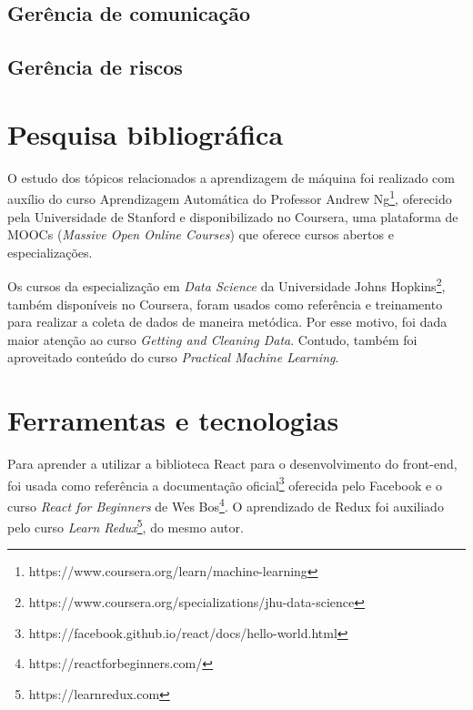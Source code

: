 
\subsection{Gerência de comunicação}


\subsection{Gerência de riscos}

\section{Pesquisa bibliográfica}

O estudo dos tópicos relacionados a aprendizagem de máquina foi realizado com auxílio do curso Aprendizagem Automática do Professor Andrew Ng\footnote{ https://www.coursera.org/learn/machine-learning}, oferecido pela Universidade de Stanford e disponibilizado no Coursera, uma plataforma de MOOCs (\textit{Massive Open Online Courses}) que oferece cursos abertos e especializações.

Os cursos da especialização em \textit{Data Science} da Universidade Johns Hopkins\footnote{ https://www.coursera.org/specializations/jhu-data-science}, também disponíveis no Coursera, foram usados como referência e treinamento para realizar a coleta de dados de maneira metódica. Por esse motivo, foi dada maior atenção ao curso \textit{Getting and Cleaning Data}. Contudo, também foi aproveitado conteúdo do curso \textit{Practical Machine Learning}.

\section{Ferramentas e tecnologias}

Para aprender a utilizar a biblioteca React para o desenvolvimento do front-end, foi usada como referência a documentação oficial\footnote{https://facebook.github.io/react/docs/hello-world.html} oferecida pelo Facebook e o curso \textit{React for Beginners} de Wes Bos\footnote{ https://reactforbeginners.com/}. O aprendizado de Redux foi auxiliado pelo curso \textit{Learn Redux}\footnote{https://learnredux.com}, do mesmo autor.
